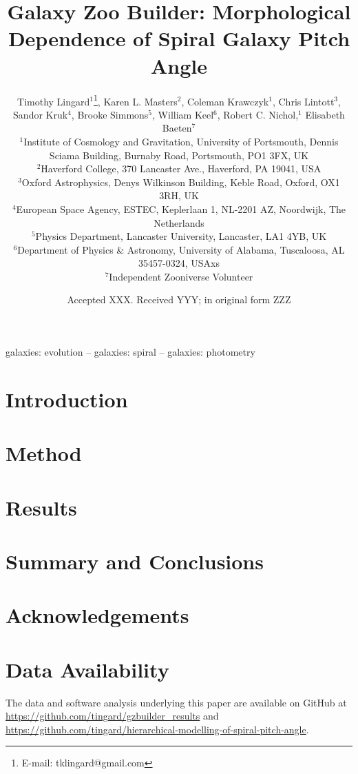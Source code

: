 \documentclass[fleqn,usenatbib]{mnras}
\title[Galaxy Zoo Builder: Morphological Dependence of Spiral galaxy Pitch Angle]{Galaxy Zoo Builder: Morphological Dependence of Spiral Galaxy Pitch Angle}
\author[T. Lingard et al.]{
  Timothy Lingard$^{1}$\thanks{E-mail: tklingard@gmail.com}, %
  Karen L. Masters$^{2}$, %
  Coleman Krawczyk$^{1}$, %
  Chris Lintott$^{3}$, %
  \newauthor
  Sandor Kruk$^{4}$, %
  Brooke Simmons$^{5}$, %
  William Keel$^{6}$, %
  Robert C. Nichol,$^{1}$ %
  \newauthor
  Elisabeth Baeten$^{7}$
  \\
  $^{1}$Institute of Cosmology and Gravitation, University of Portsmouth, Dennis Sciama Building, Burnaby Road, Portsmouth, PO1 3FX, UK\\
  $^{2}$Haverford College, 370 Lancaster Ave., Haverford, PA 19041, USA\\
  $^{3}$Oxford Astrophysics, Denys Wilkinson Building, Keble Road, Oxford, OX1 3RH, UK\\
  $^{4}$European Space Agency, ESTEC, Keplerlaan 1, NL-2201 AZ, Noordwijk, The Netherlands\\
  $^{5}$Physics Department, Lancaster University, Lancaster, LA1 4YB, UK\\
  $^{6}$Department of Physics \& Astronomy, University of Alabama, Tuscaloosa, AL 35457-0324, USAxs\\
  $^{7}$Independent Zooniverse Volunteer\\
}
\date{Accepted XXX. Received YYY; in original form ZZZ}
\begin{document}
\label{firstpage}
\pagerange{\pageref{firstpage}--\pageref{lastpage}}
\maketitle

\begin{abstract}

\end{abstract}

\begin{keywords}
galaxies: evolution -- galaxies: spiral -- galaxies: photometry
\end{keywords}



% 

\section{Introduction}


\section{Method}


\section{Results}


\section{Summary and Conclusions}


\section{Acknowledgements}


\section{Data Availability}
The data and software analysis underlying this paper are available on GitHub at \url{https://github.com/tingard/gzbuilder_results} and \url{https://github.com/tingard/hierarchical-modelling-of-spiral-pitch-angle}.
\end{document}
